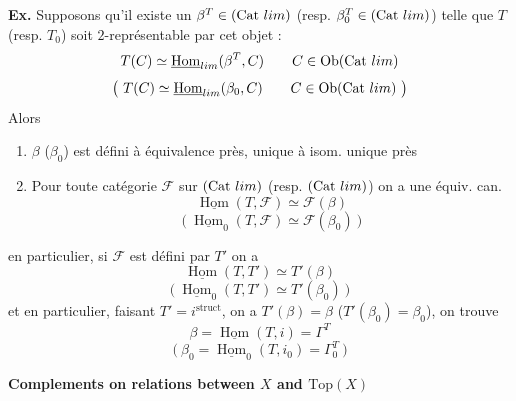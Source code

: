 \documentclass[11pt,a4paper]{article}
\begin{document}


\textbf{Ex.} Supposons qu'il existe un
$\beta^{T} \in (\mathrm{Cat}\ \varprojlim)$ (resp.
$\beta_{0}^{T} \in (\mathrm{Cat}\ \varprojlim)$) telle que $T$ (resp. $T_{0}$)
soit  $2$-représentable par cet objet :
\[
T(C) \simeq \underline{\operatorname{Hom}}_{\varprojlim}(\beta^{T}, C) \qquad
C \in \mathrm{Ob}(\mathrm{Cat}\ \varprojlim)
\]
\[
\bigl(\ T(C) \simeq \underline{\operatorname{Hom}}_{\varprojlim}(\beta_{0}, C)
\qquad C \in \mathrm{Ob}(\mathrm{Cat}\ \varprojlim)\ \bigr)
\]
Alors
\begin{enumerate}
\item[a)] $\beta$ ($\beta_{0}$) est défini à équivalence près,
 unique à isom. unique près
\item[b)] Pour toute catégorie  $\mathcal{F}$ sur
$(\mathrm{Cat}\ \varprojlim)$ (resp. $(\mathrm{Cat}\ \varprojlim)$) on a une
équiv. can.
\[
\underline{\operatorname{Hom}}(T, \mathcal{F}) \simeq \mathcal{F}(\beta)
\]
\[
\bigl(\ \underline{\operatorname{Hom}}_{0}(T, \mathcal{F}) \simeq
\mathcal{F}(\beta_{0})\ \bigr)
\]
\end{enumerate}
en particulier, si $\mathcal{F}$ est défini par $T'$ on a
\[
\underline{\operatorname{Hom}}(T, T') \simeq T'(\beta)
\]
\[
\bigl(\ \underline{\operatorname{Hom}}_{0}(T, T') \simeq T'(\beta_{0})\ \bigr)
\]
et en particulier, faisant $T' = i^{\text{struct}}$, on a $T'(\beta) = \beta$
($T'(\beta_{0}) = \beta_{0}$), on trouve
\[
\beta = \underline{\operatorname{Hom}}(T, i) = \Gamma^{T}
\]
\[
\bigl(\ \beta_{0} = \underline{\operatorname{Hom}}_{0}(T, i_{0}) =
\Gamma_{0}^{T}\ \bigr)
\]

\textbf{Complements on relations between $X$ and $\mathrm{Top}(X)$}
\end{document}
